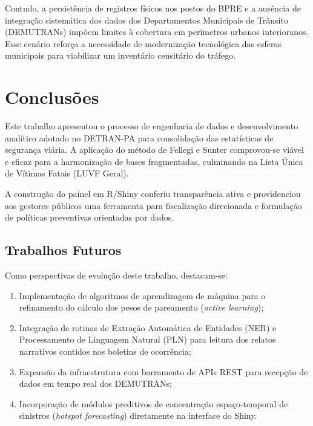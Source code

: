\documentclass[sigconf, nonacm, screen, language=portuguese, language=spanish, language={main=english}]{acmart}
\begin{document}
Contudo, a persistência de registros físicos nos postos do BPRE e a ausência de integração sistemática dos dados dos Departamentos Municipais de Trânsito (DEMUTRANs) impõem limites à cobertura em perímetros urbanos interioranos. Esse cenário reforça a necessidade de modernização tecnológica das esferas municipais para viabilizar um inventário censitário do tráfego.

\section{Conclusões}\label{sec:conclusao}
Este trabalho apresentou o processo de engenharia de dados e desenvolvimento analítico adotado no DETRAN-PA para consolidação das estatísticas de segurança viária. A aplicação do método de Fellegi e Sunter comprovou-se viável e eficaz para a harmonização de bases fragmentadas, culminando na Lista Única de Vítimas Fatais (LUVF Geral).

A construção do painel em R/Shiny conferiu transparência ativa e providenciou aos gestores públicos uma ferramenta para fiscalização direcionada e formulação de políticas preventivas orientadas por dados.

\subsection{Trabalhos Futuros}\label{sec:trabalhos_futuros}
Como perspectivas de evolução deste trabalho, destacam-se:
\begin{enumerate}
    \item Implementação de algoritmos de aprendizagem de máquina para o refinamento do cálculo dos pesos de pareamento (\textit{active learning});
    \item Integração de rotinas de Extração Automática de Entidades (NER) e Processamento de Linguagem Natural (PLN) para leitura dos relatos narrativos contidos nos boletins de ocorrência;
    \item Expansão da infraestrutura com barramento de APIs REST para recepção de dados em tempo real dos DEMUTRANs;
    \item Incorporação de módulos preditivos de concentração espaço-temporal de sinistros (\textit{hotspot forecasting}) diretamente na interface do Shiny.
\end{enumerate}
\end{document}
